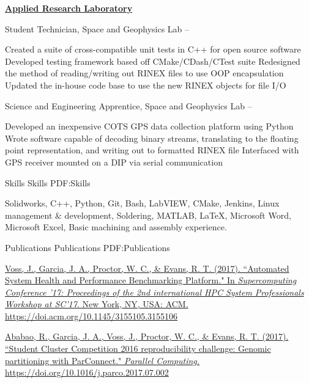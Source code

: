 \documentclass[letterpaper,MMMyyyy,nonstopmode]{simpleresumecv}
\begin{document}
\begin{Body}
\BigGap

\Entry
\href{http://arlut.utexas.edu}
{\textbf{Applied Research Laboratory}}

\Gap
\BulletItem
Student Technician, Space and Geophysics Lab
\hfill
{} --
\begin{Detail}
\SubBulletItem
Created a suite of cross-compatible unit tests in C++ for open source software
\SubBulletItem
Developed testing framework based off CMake/CDash/CTest suite
\SubBulletItem
Redesigned the method of reading/writing out RINEX files to use OOP encapsulation
\SubBulletItem
Updated the in-house code base to use the new RINEX objects for file I/O
\end{Detail}

\Gap
\BulletItem
Science and Engineering Apprentice, Space and Geophysics Lab
\hfill
{} --
\begin{Detail}
\SubBulletItem
Developed an inexpensive COTS GPS data collection platform using Python
\SubBulletItem
Wrote software capable of decoding binary streams, translating to the floating point \newline
representation, and writing out to formatted RINEX file
\SubBulletItem
Interfaced with GPS receiver mounted on a DIP via serial communication
\end{Detail}



\Section
{Skills}
{Skills}
{PDF:Skills}

\Entry
Solidworks,
C++, 
Python, 
Git, 
Bash,
LabVIEW,
CMake,
Jenkins,
Linux management \& development, 
Soldering,
MATLAB,
\LaTeX,
Microsoft Word,
Microsoft Excel,
Basic machining and assembly experience.


\Section
{Publications}
{Publications}
{PDF:Publications}

\Entry
\href{http://doi.acm.org/10.1145/3155105.3155106}
{\underline{Voss, J.}, Garcia, J. A., Proctor, W. C., \& Evans, R. T.
(2017). ``Automated System Health and Performance Benchmarking Platform."
In \textit{Supercomputing Conference '17: Proceedings of the 2nd international
HPC System Professionals Workshop at SC'17}. New York, NY, USA: ACM.
https://doi.acm.org/10.1145/3155105.3155106}
\Gap

\Entry
\href{https://doi.org/10.1016/j.parco.2017.07.002}
{Ababao, R., Garcia, J. A., \underline{Voss, J.}, Proctor, W. C., \& Evans, R.
T. (2017). ``Student Cluster Competition 2016 reproducibility challenge: Genomic
partitioning with ParConnect." \textit{Parallel Computing.}
https://doi.org/10.1016/j.parco.2017.07.002}


\end{Body}
\end{document}
